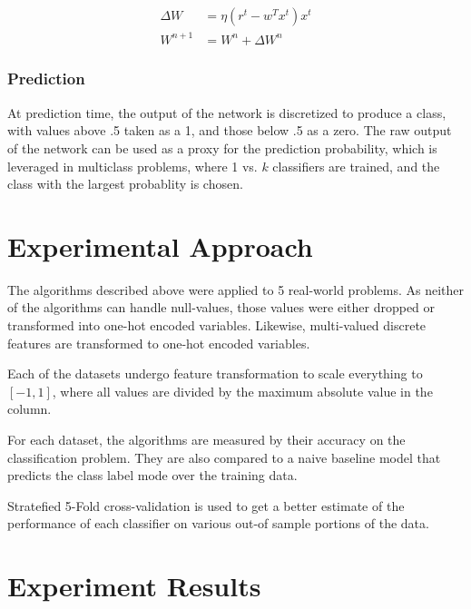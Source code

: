 \documentclass{amsart}
\begin{document}
    \begin{align*}
        \Delta W &= \eta (r^t - w^T x^t) x^t \\
        W^{n+1} &= W^n + \Delta W^{n}
    \end{align*}

    \subsubsection*{Prediction}
    At prediction time, the output of the network is discretized to produce a class, with values above .5 taken
    as a 1, and those below .5 as a zero. The raw output of the network can be used as a proxy for the prediction probability,
    which is leveraged in multiclass problems, where 1 vs. $k$ classifiers are trained, and the class with the
    largest probablity is chosen.

    \section{Experimental Approach}
    The algorithms described above were applied to 5 real-world problems. As neither of the algorithms can
    handle null-values, those values were either dropped or transformed into one-hot encoded variables. Likewise,
    multi-valued discrete features are transformed to one-hot encoded variables.

    Each of the datasets undergo feature transformation to scale everything to $[-1,1]$, where
    all values are divided by the maximum absolute value in the column.

    For each dataset, the algorithms are measured by their accuracy on the classification problem. They are also compared
    to a naive baseline model that predicts the class label mode over the training data.

    Stratefied 5-Fold cross-validation is used to get a better estimate of the performance of each classifier on
    various out-of sample portions of the data.

    \section{Experiment Results}
\end{document}
